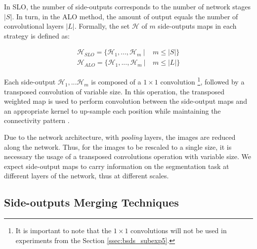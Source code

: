 % 

In SLO, the number of side-outputs corresponds to the number of network stages $|S|$.
In turn, in the ALO method, the amount of output equals the number of convolutional layers $|L|$.
Formally, the set $ \mathcal{H}$ of $m$ side-outputs maps in each strategy is defined as:

\begin{align}
\mathcal{H}_{SLO}=\{\mathcal{H}_1,...,\mathcal{H}_m~|&~ m \le |S|\}\\
\mathcal{H}_{ALO}=\{\mathcal{H}_1,...,\mathcal{H}_m~|&~ m \le |L|\}
\end{align}

Each side-output $\mathcal{H}_1, ... \mathcal{H}_m$ is composed of a $1 \times 1$ convolution \footnote{It is important to note that the $1 \times 1$ convolutions will not be used in experiments from the Section \ref{ssec:bsds_subexp5}.}, followed by a transposed convolution of variable size.
In this operation, the transposed weighted map is used to perform convolution between the side-output maps and an appropriate kernel to up-sample each position while maintaining the connectivity pattern \cite{Dumoulin:2016}.

Due to the network architecture, with \textit{pooling} layers, the images are reduced along the network. 
Thus, for the images to be rescaled to a single size, it is necessary the usage of a transposed convolutions operation with variable size.
We expect side-output maps to carry information on the segmentation task at different layers of the network, thus at different scales.




\subsection{Side-outputs Merging Techniques}
\label{cap5_func_combinar_saidas}

